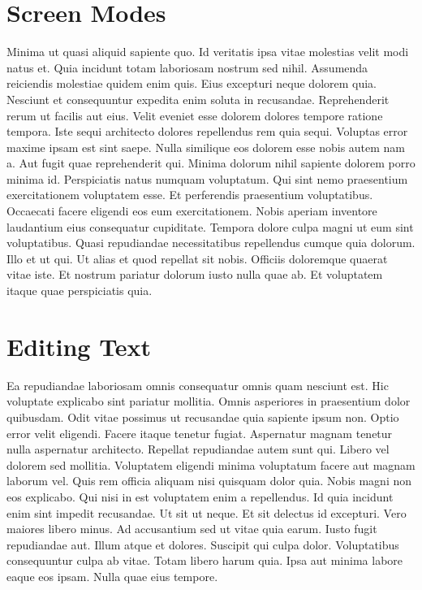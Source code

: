 
\chapter{Screen Modes}

Minima ut quasi aliquid sapiente quo. Id veritatis ipsa vitae molestias velit
modi natus et. Quia incidunt totam laboriosam nostrum sed nihil. Assumenda
reiciendis molestiae quidem enim quis. Eius excepturi neque dolorem quia.
Nesciunt et consequuntur expedita enim soluta in recusandae. Reprehenderit
rerum ut facilis aut eius. Velit eveniet esse dolorem dolores tempore ratione
tempora. Iste sequi architecto dolores repellendus rem quia sequi. Voluptas
error maxime ipsam est sint saepe. Nulla similique eos dolorem esse nobis autem
nam a. Aut fugit quae reprehenderit qui. Minima dolorum nihil sapiente dolorem
porro minima id. Perspiciatis natus numquam voluptatum. Qui sint nemo
praesentium exercitationem voluptatem esse. Et perferendis praesentium
voluptatibus. Occaecati facere eligendi eos eum exercitationem. Nobis aperiam
inventore laudantium eius consequatur cupiditate. Tempora dolore culpa magni ut
eum sint voluptatibus. Quasi repudiandae necessitatibus repellendus cumque quia
dolorum. Illo et ut qui. Ut alias et quod repellat sit nobis. Officiis
doloremque quaerat vitae iste. Et nostrum pariatur dolorum iusto nulla quae ab.
Et voluptatem itaque quae perspiciatis quia.


\chapter{Editing Text}

Ea repudiandae laboriosam omnis consequatur omnis quam nesciunt est. Hic
voluptate explicabo sint pariatur mollitia. Omnis asperiores in praesentium
dolor quibusdam. Odit vitae possimus ut recusandae quia sapiente ipsum non.
Optio error velit eligendi. Facere itaque tenetur fugiat. Aspernatur magnam
tenetur nulla aspernatur architecto. Repellat repudiandae autem sunt qui.
Libero vel dolorem sed mollitia. Voluptatem eligendi minima voluptatum facere
aut magnam laborum vel. Quis rem officia aliquam nisi quisquam dolor quia.
Nobis magni non eos explicabo. Qui nisi in est voluptatem enim a repellendus.
Id quia incidunt enim sint impedit recusandae. Ut sit ut neque. Et sit delectus
id excepturi. Vero maiores libero minus. Ad accusantium sed ut vitae quia
earum. Iusto fugit repudiandae aut. Illum atque et dolores. Suscipit qui culpa
dolor. Voluptatibus consequuntur culpa ab vitae. Totam libero harum quia. Ipsa
aut minima labore eaque eos ipsam. Nulla quae eius tempore.

\@openrighttrue\makeatother
